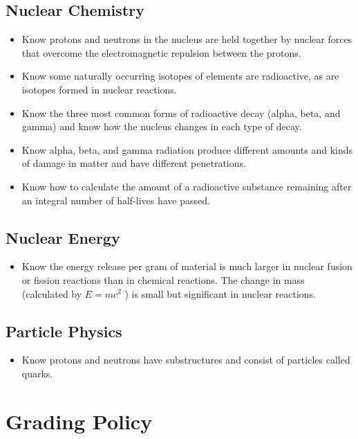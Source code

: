 \documentclass[11pt]{article}
\begin{document}
\subsection{Nuclear Chemistry}
\label{sec:orgdf702aa}

\begin{itemize}
\item Know protons and neutrons in the nucleus are held together by nuclear forces that overcome the electromagnetic repulsion between the protons.
\item Know some naturally occurring isotopes of elements are radioactive, as are isotopes formed in nuclear reactions.
\item Know the three most common forms of radioactive decay (alpha, beta, and gamma) and know how the nucleus changes in each type of decay.
\item Know alpha, beta, and gamma radiation produce different amounts and kinds of damage in matter and have different penetrations.
\item Know how to calculate the amount of a radioactive substance remaining after an integral number of half-lives have passed.
\end{itemize}
\subsection{Nuclear Energy}
\label{sec:orgc7595d8}

\begin{itemize}
\item Know the energy release per gram of material is much larger in nuclear fusion or fission reactions than in chemical reactions. The change in mass (calculated by \(E = mc^2\) ) is small but significant in nuclear reactions.
\end{itemize}
\subsection{Particle Physics}
\label{sec:org6a74da4}

\begin{itemize}
\item Know protons and neutrons have substructures and consist of particles called quarks.
\end{itemize}
\section{Grading Policy}
\label{sec:org437665e}
\end{document}
